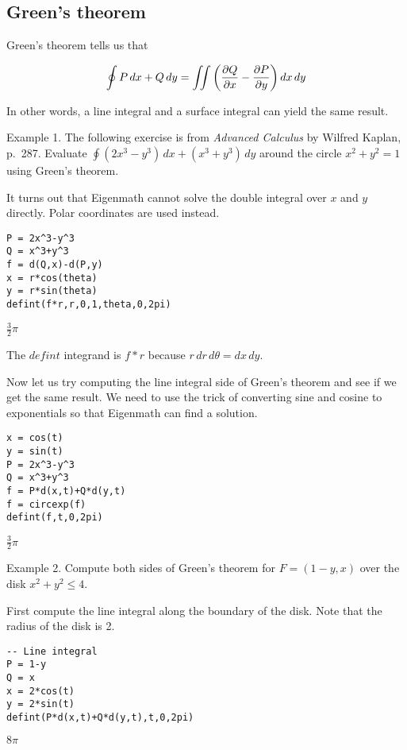 
\subsection{Green's theorem}
Green's theorem tells us that

$$\oint P\,dx+Q\,dy=\int\!\!\!\int
\left({\partial Q\over\partial x}-{\partial P\over\partial y}\right)
dx\,dy$$

In other words, a line integral and a surface integral can yield
the same result.

Example 1.
The following exercise is from {\it Advanced Calculus}
by Wilfred Kaplan, p.~287.
Evaluate $\oint (2x^3-y^3)\,dx+(x^3+y^3)\,dy$ around the circle
$x^2+y^2=1$ using Green's theorem.

It turns out that Eigenmath cannot solve the double integral over
$x$ and $y$ directly.
Polar coordinates are used instead.

\begin{Verbatim}[formatcom=\color{blue},samepage=true]
P = 2x^3-y^3
Q = x^3+y^3
f = d(Q,x)-d(P,y)
x = r*cos(theta)
y = r*sin(theta)
defint(f*r,r,0,1,theta,0,2pi)
\end{Verbatim}

$\displaystyle \frac{3}{2}\pi$

The $defint$ integrand is $f{*}r$ because $r\,dr\,d\theta=dx\,dy$.

Now let us try computing the line integral side of Green's theorem
and see if we get the same result.
We need to use the trick of converting sine and cosine to exponentials
so that Eigenmath can find a solution.

\begin{Verbatim}[formatcom=\color{blue},samepage=true]
x = cos(t)
y = sin(t)
P = 2x^3-y^3
Q = x^3+y^3
f = P*d(x,t)+Q*d(y,t)
f = circexp(f)
defint(f,t,0,2pi)
\end{Verbatim}

$\displaystyle \frac{3}{2}\pi$

Example 2.
Compute both sides of Green's theorem for
$F=(1-y,x)$ over the disk $x^2+y^2\le4$.

First compute the line integral along the boundary of the disk.
Note that the radius of the disk is 2.

\begin{Verbatim}[formatcom=\color{blue},samepage=true]
-- Line integral
P = 1-y
Q = x
x = 2*cos(t)
y = 2*sin(t)
defint(P*d(x,t)+Q*d(y,t),t,0,2pi)
\end{Verbatim}

$\displaystyle 8\pi$

